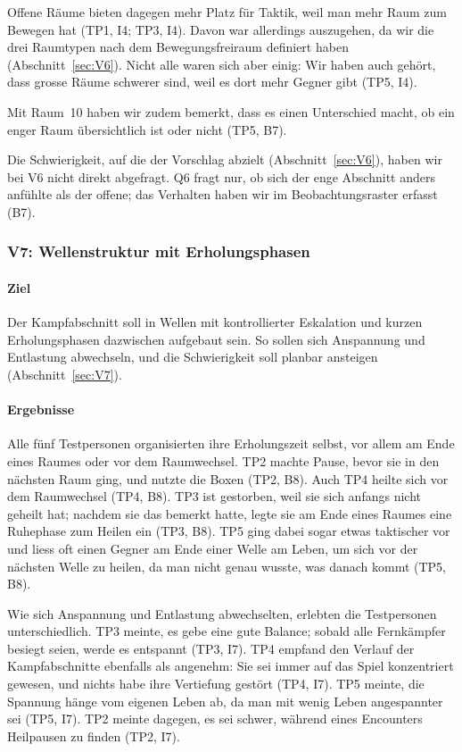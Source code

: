 \documentclass[../Main.tex]{subfiles}
\begin{document}
Offene Räume bieten dagegen mehr Platz für Taktik, weil man mehr Raum zum Bewegen hat (TP1, I4; TP3, I4). Davon war allerdings auszugehen, da wir die drei Raumtypen nach dem Bewegungsfreiraum definiert haben (Abschnitt~\ref{sec:V6}). Nicht alle waren sich aber einig: Wir haben auch gehört, dass grosse Räume schwerer sind, weil es dort mehr Gegner gibt (TP5, I4).

Mit Raum~10 haben wir zudem bemerkt, dass es einen Unterschied macht, ob ein enger Raum übersichtlich ist oder nicht (TP5, B7).

Die Schwierigkeit, auf die der Vorschlag abzielt (Abschnitt~\ref{sec:V6}), haben wir bei V6 nicht direkt abgefragt. Q6 fragt nur, ob sich der enge Abschnitt anders anfühlte als der offene; das Verhalten haben wir im Beobachtungsraster erfasst (B7).

\subsubsection{V7: Wellenstruktur mit Erholungsphasen}

\paragraph{Ziel}
Der Kampfabschnitt soll in Wellen mit kontrollierter Eskalation und kurzen Erholungsphasen dazwischen aufgebaut sein. So sollen sich Anspannung und Entlastung abwechseln, und die Schwierigkeit soll planbar ansteigen (Abschnitt~\ref{sec:V7}).

\paragraph{Ergebnisse}
Alle fünf Testpersonen organisierten ihre Erholungszeit selbst, vor allem am Ende eines Raumes oder vor dem Raumwechsel. TP2 machte Pause, bevor sie in den nächsten Raum ging, und nutzte die Boxen (TP2, B8). Auch TP4 heilte sich vor dem Raumwechsel (TP4, B8). TP3 ist gestorben, weil sie sich anfangs nicht geheilt hat; nachdem sie das bemerkt hatte, legte sie am Ende eines Raumes eine Ruhephase zum Heilen ein (TP3, B8). TP5 ging dabei sogar etwas taktischer vor und liess oft einen Gegner am Ende einer Welle am Leben, um sich vor der nächsten Welle zu heilen, da man nicht genau wusste, was danach kommt (TP5, B8).

Wie sich Anspannung und Entlastung abwechselten, erlebten die Testpersonen unterschiedlich. TP3 meinte, es gebe eine gute Balance; sobald alle Fernkämpfer besiegt seien, werde es entspannt (TP3, I7). TP4 empfand den Verlauf der Kampfabschnitte ebenfalls als angenehm: Sie sei immer auf das Spiel konzentriert gewesen, und nichts habe ihre Vertiefung gestört (TP4, I7). TP5 meinte, die Spannung hänge vom eigenen Leben ab, da man mit wenig Leben angespannter sei (TP5, I7). TP2 meinte dagegen, es sei schwer, während eines Encounters Heilpausen zu finden (TP2, I7).
\end{document}
